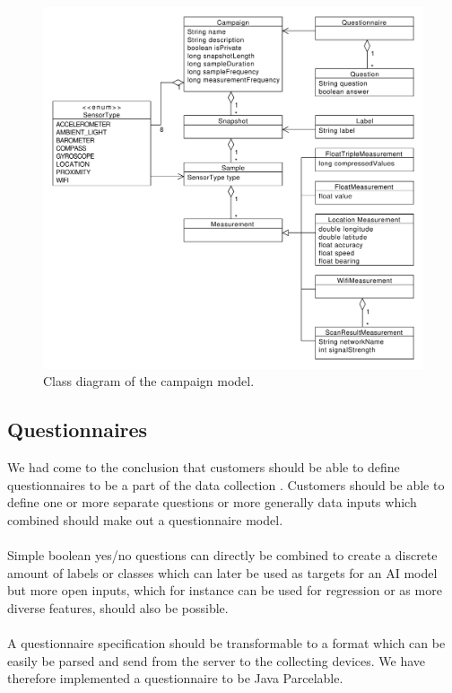 
\begin{figure}[!htbp]
    \centering
    \includegraphics[width=\textwidth]{graphic/gathering_sensor_data/model_class_diagram.pdf}
    \caption{Class diagram of the campaign model.}
    \label{fig:model_class_diagram}
\end{figure}
\FloatBarrier


\subsection{Questionnaires}
We had come to the conclusion that customers should be able to define questionnaires to be a part of the data collection . Customers should be able to define one or more separate questions or more generally data inputs which combined should make out a questionnaire model. 
\\\\
Simple boolean yes/no questions can directly be combined to create a discrete amount of labels or classes which can later be used as targets for an AI model but more open inputs, which for instance can be used for regression or as more diverse features, should also be possible. 
\\\\
A questionnaire specification should be transformable to a format which can be easily be parsed and send from the server to the collecting devices. We have therefore implemented a questionnaire to be Java Parcelable. 

